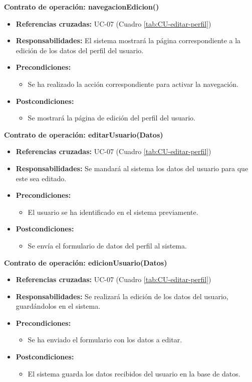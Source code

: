 \textbf{Contrato de operación: navegacionEdicion()}
\begin{itemize}
\item \textbf{Referencias cruzadas:} UC-07 (Cuadro \ref{tab:CU-editar-perfil})
\item \textbf{Responsabilidades:} El sistema mostrará la página correspondiente a la edición de los datos del perfil del usuario.
\item \textbf{Precondiciones:} 
 \begin{itemize}
\item Se ha realizado la acción correspondiente para activar la navegación.
\end {itemize}
\item \textbf{Postcondiciones:} 
 \begin{itemize}
\item Se mostrará la página de edición del perfil del usuario.
\end {itemize}
\end {itemize}

\textbf{Contrato de operación: editarUsuario(Datos)}
\begin{itemize}
\item \textbf{Referencias cruzadas:} UC-07 (Cuadro \ref{tab:CU-editar-perfil})
\item \textbf{Responsabilidades:} Se mandará al sistema los datos del usuario para que este sea editado.
\item \textbf{Precondiciones:} 
 \begin{itemize}
\item El usuario se ha identificado en el sistema previamente.
\end {itemize}
\item \textbf{Postcondiciones:} 
 \begin{itemize}
\item Se envía el formulario de datos del perfil al sistema.
\end {itemize}
\end {itemize}

\textbf{Contrato de operación: edicionUsuario(Datos)}
\begin{itemize}
\item \textbf{Referencias cruzadas:} UC-07 (Cuadro \ref{tab:CU-editar-perfil})
\item \textbf{Responsabilidades:} Se realizará la edición de los datos del usuario, guardándolos en el sistema.
\item \textbf{Precondiciones:} 
 \begin{itemize}
\item Se ha enviado el formulario con los datos a editar.
\end {itemize}
\item \textbf{Postcondiciones:} 
 \begin{itemize}
\item El sistema guarda los datos recibidos del usuario en la base de datos.
\end {itemize}
\end {itemize}

